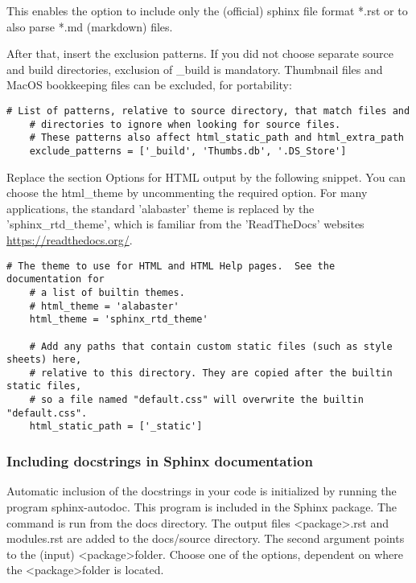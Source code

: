 This enables the option to include only the (official) \textsf{sphinx} file format \textsf{*.rst} or to also parse \textsf{*.md} (markdown) files.

After that, insert the exclusion patterns. If you did not choose separate source and build directories, exclusion of \textsf{\_build} is mandatory. Thumbnail files and MacOS bookkeeping files can be excluded, for portability:

\begin{lstlisting}[style=DOS]
	# List of patterns, relative to source directory, that match files and
	# directories to ignore when looking for source files.
	# These patterns also affect html_static_path and html_extra_path
	exclude_patterns = ['_build', 'Thumbs.db', '.DS_Store']
\end{lstlisting}

Replace the section \textsf{Options for HTML output} by the following snippet. You can choose the \textsf{html\_theme} by uncommenting the required option. For many applications, the standard 'alabaster' theme is replaced by the 'sphinx\_rtd\_theme', which is familiar from the 'ReadTheDocs' websites \url{https://readthedocs.org/}.

\begin{lstlisting}[style=DOS]
	# The theme to use for HTML and HTML Help pages.  See the documentation for
	# a list of builtin themes.
	# html_theme = 'alabaster'
	html_theme = 'sphinx_rtd_theme'
	
	# Add any paths that contain custom static files (such as style sheets) here,
	# relative to this directory. They are copied after the builtin static files,
	# so a file named "default.css" will overwrite the builtin "default.css".
	html_static_path = ['_static']
\end{lstlisting}

\subsubsection{Including docstrings in Sphinx documentation}

Automatic inclusion of the docstrings in your code is initialized by running the program \textsf{sphinx-autodoc}. This program is included in the \textsf{Sphinx} package. The command is run from the \textsf{docs} directory. The output files \textsf{\textless package\textgreater.rst} and \textsf{modules.rst} are added to the \textsf{docs/source} directory. The second argument points to the (input) \textless package\textgreater folder. Choose one of the options, dependent on where the \textless package\textgreater folder is located.

